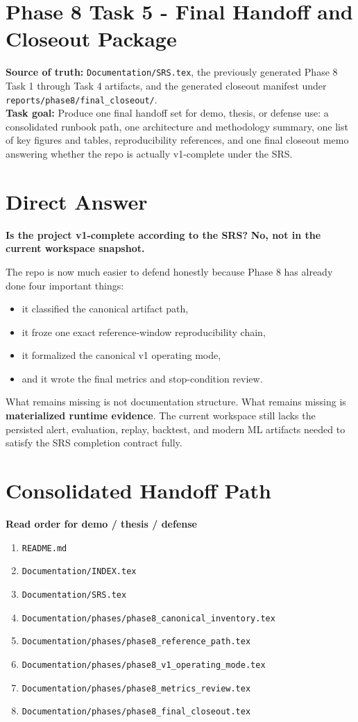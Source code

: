 \documentclass{article}
\begin{document}
\section*{Phase 8 Task 5 - Final Handoff and Closeout Package}

\textbf{Source of truth:} \texttt{Documentation/SRS.tex}, the previously generated Phase 8 Task 1 through Task 4 artifacts, and the generated closeout manifest under \texttt{reports/phase8/final\_closeout/}.\\
\textbf{Task goal:} Produce one final handoff set for demo, thesis, or defense use: a consolidated runbook path, one architecture and methodology summary, one list of key figures and tables, reproducibility references, and one final closeout memo answering whether the repo is actually v1-complete under the SRS.

\section*{Direct Answer}
\textbf{Is the project v1-complete according to the SRS?} \textbf{No, not in the current workspace snapshot.}

The repo is now much easier to defend honestly because Phase 8 has already done four important things:
\begin{itemize}
\item it classified the canonical artifact path,
\item it froze one exact reference-window reproducibility chain,
\item it formalized the canonical v1 operating mode,
\item and it wrote the final metrics and stop-condition review.
\end{itemize}

What remains missing is not documentation structure. What remains missing is \textbf{materialized runtime evidence}. The current workspace still lacks the persisted alert, evaluation, replay, backtest, and modern ML artifacts needed to satisfy the SRS completion contract fully.

\section*{Consolidated Handoff Path}
\textbf{Read order for demo / thesis / defense}
\begin{enumerate}
\item \texttt{README.md}
\item \texttt{Documentation/INDEX.tex}
\item \texttt{Documentation/SRS.tex}
\item \texttt{Documentation/phases/phase8\_canonical\_inventory.tex}
\item \texttt{Documentation/phases/phase8\_reference\_path.tex}
\item \texttt{Documentation/phases/phase8\_v1\_operating\_mode.tex}
\item \texttt{Documentation/phases/phase8\_metrics\_review.tex}
\item \texttt{Documentation/phases/phase8\_final\_closeout.tex}
\end{enumerate}
\end{document}
